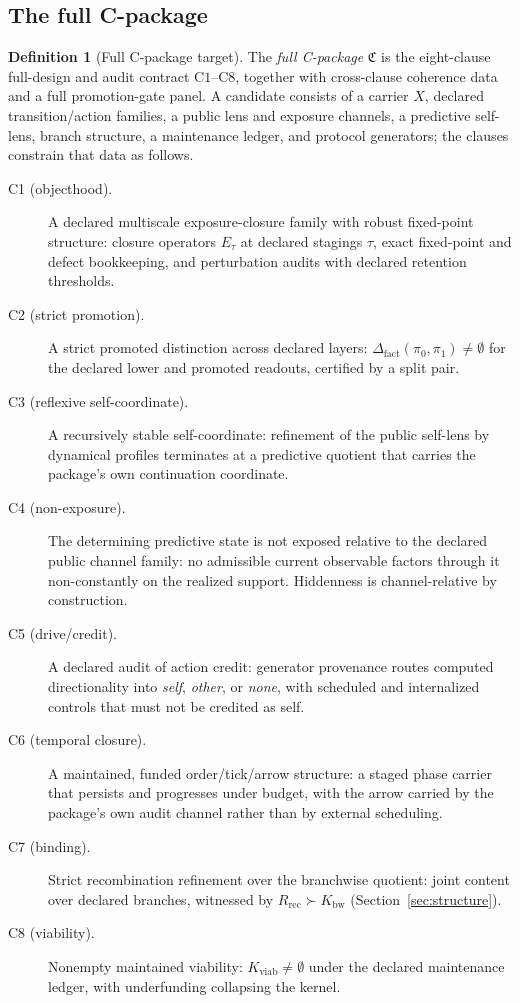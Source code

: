 \documentclass[11pt]{article}
\newcommand{\Kviab}{K_{\mathrm{viab}}}
\newcommand{\Kbw}{K_{\mathrm{bw}}}
\newcommand{\Rrec}{R_{\mathrm{rec}}}
\newcommand{\Cpkg}{\mathfrak{C}}
\newcommand{\Dfact}{\Delta_{\mathrm{fact}}}
\theoremstyle{definition}
\newtheorem{definition}[theorem]{Definition}
\begin{document}
\subsection{The full C-package}
\label{sec:cpackage}

\begin{definition}[Full C-package target]
\label{def:cpackage}
The \emph{full C-package} $\Cpkg$ is the eight-clause full-design and audit
contract $\mathrm{C1}$--$\mathrm{C8}$, together with cross-clause coherence
data and a full promotion-gate panel. A candidate consists of a carrier $X$,
declared transition/action families, a public lens and exposure channels, a
predictive self-lens, branch structure, a maintenance ledger, and protocol
generators; the clauses constrain that data as follows.
\begin{description}
\item[C1 (objecthood).] A declared multiscale exposure-closure family with
robust fixed-point structure: closure operators $E_\tau$ at declared stagings
$\tau$, exact fixed-point and defect bookkeeping, and perturbation audits with
declared retention thresholds.
\item[C2 (strict promotion).] A strict promoted distinction across declared
layers: $\Dfact(\pi_0,\pi_1)\neq\emptyset$ for the declared lower and promoted
readouts, certified by a split pair.
\item[C3 (reflexive self-coordinate).] A recursively stable self-coordinate:
refinement of the public self-lens by dynamical profiles terminates at a
predictive quotient that carries the package's own continuation coordinate.
\item[C4 (non-exposure).] The determining predictive state is not exposed
relative to the declared public channel family: no admissible current
observable factors through it non-constantly on the realized support.
Hiddenness is channel-relative by construction.
\item[C5 (drive/credit).] A declared audit of action credit: generator
provenance routes computed directionality into \emph{self}, \emph{other}, or
\emph{none}, with scheduled and internalized controls that must not be
credited as self.
\item[C6 (temporal closure).] A maintained, funded order/tick/arrow structure:
a staged phase carrier that persists and progresses under budget, with the
arrow carried by the package's own audit channel rather than by external
scheduling.
\item[C7 (binding).] Strict recombination refinement over the branchwise
quotient: joint content over declared branches, witnessed by
$\Rrec \succ \Kbw$ (Section~\ref{sec:structure}).
\item[C8 (viability).] Nonempty maintained viability: $\Kviab\neq\emptyset$
under the declared maintenance ledger, with underfunding collapsing the
kernel.
\end{description}
\end{definition}
\end{document}
